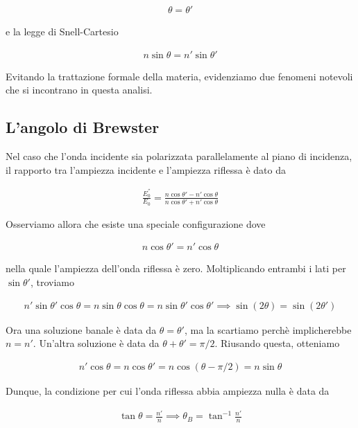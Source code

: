 \documentclass{report}
\begin{document}
\begin{align}
    \theta = \theta '
\end{align}

e la legge di Snell-Cartesio

\begin{align}
    n \sin\theta = n'\sin \theta '
\end{align}

Evitando la trattazione formale della materia, evidenziamo due fenomeni notevoli che si incontrano in questa analisi. 

\subsection{L'angolo di Brewster}

Nel caso che l'onda incidente sia polarizzata parallelamente al piano di incidenza, il rapporto tra l'ampiezza incidente e l'ampiezza riflessa è dato da 

\begin{align}
    \frac{E_0^{''}}{E_0} = \frac{n\cos\theta' - n' \cos \theta}{n\cos\theta' + n' \cos \theta}
\end{align}

Osserviamo allora che esiste una speciale configurazione dove 

\begin{align}
    n \cos \theta' = n' \cos \theta
\end{align}

nella quale l'ampiezza dell'onda riflessa è zero. Moltiplicando entrambi i lati per \(\sin\theta'\), troviamo 

\begin{align}
    n' \sin \theta' \cos \theta = n \sin \theta \cos \theta = n \sin \theta' \cos \theta ' \implies \sin (2\theta) = \sin (2\theta')
\end{align}

Ora una soluzione banale è data da \(\theta = \theta'\), ma la scartiamo perchè implicherebbe \(n = n'\). Un'altra soluzione è data da \(\theta + \theta' = \pi/2\). Riusando questa, otteniamo 

\begin{align}
    n' \cos \theta = n\cos \theta' = n \cos (\theta - \pi/2) = n \sin \theta
\end{align}

Dunque, la condizione per cui l'onda riflessa abbia ampiezza nulla è data da 

\begin{align}
    \tan \theta = \frac{n'}{n} \implies \theta_B = \tan^{-1}\frac{n'}{n}
\end{align}
\end{document}
